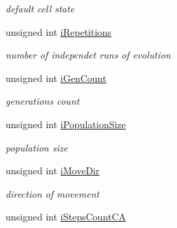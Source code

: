 \begin{DoxyCompactItemize}
\begin{DoxyCompactList}\small\item\em default cell state \item\end{DoxyCompactList}\item 
\hypertarget{classCConfigCore_af67c2f947f1532f70db2283cd7f7b414}{
unsigned int \hyperlink{classCConfigCore_af67c2f947f1532f70db2283cd7f7b414}{iRepetitions}}
\label{classCConfigCore_af67c2f947f1532f70db2283cd7f7b414}

\begin{DoxyCompactList}\small\item\em number of independet runs of evolution \item\end{DoxyCompactList}\item 
\hypertarget{classCConfigCore_a0e296dc7801be8e538abd1cf12234f90}{
unsigned int \hyperlink{classCConfigCore_a0e296dc7801be8e538abd1cf12234f90}{iGenCount}}
\label{classCConfigCore_a0e296dc7801be8e538abd1cf12234f90}

\begin{DoxyCompactList}\small\item\em generations count \item\end{DoxyCompactList}\item 
\hypertarget{classCConfigCore_a13b09746af465cac96357a39ada4a4c2}{
unsigned int \hyperlink{classCConfigCore_a13b09746af465cac96357a39ada4a4c2}{iPopulationSize}}
\label{classCConfigCore_a13b09746af465cac96357a39ada4a4c2}

\begin{DoxyCompactList}\small\item\em population size \item\end{DoxyCompactList}\item 
\hypertarget{classCConfigCore_a337aeaa424dac9c70e59762a33983112}{
unsigned int \hyperlink{classCConfigCore_a337aeaa424dac9c70e59762a33983112}{iMoveDir}}
\label{classCConfigCore_a337aeaa424dac9c70e59762a33983112}

\begin{DoxyCompactList}\small\item\em direction of movement \item\end{DoxyCompactList}\item 
\hypertarget{classCConfigCore_a0edd9af2e1964e28191f82c959ff7c50}{
unsigned int \hyperlink{classCConfigCore_a0edd9af2e1964e28191f82c959ff7c50}{iStepsCountCA}}
\label{classCConfigCore_a0edd9af2e1964e28191f82c959ff7c50}


\end{DoxyCompactItemize}

